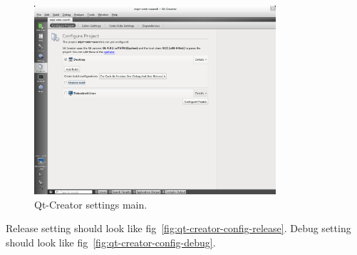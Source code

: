 \documentclass[11pt, oneside, a4paper]{scrartcl}
\begin{document}
\begin{figure}[ht]
  \centering
  \includegraphics[width=0.8\textwidth]{./qt-creator-config-main.png}
  \caption{Qt-Creator settings main.}
  \label{fig:qt-creator-config-main}
\end{figure}

Release setting should look like fig~\ref{fig:qt-creator-config-release}. Debug setting should look like fig~\ref{fig:qt-creator-config-debug}.
\end{document}
